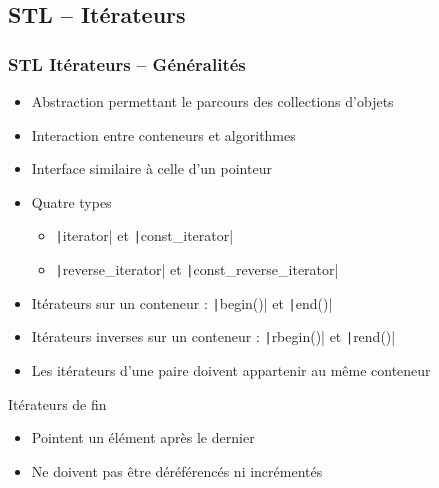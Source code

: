 \documentclass[C++.tex]{subfiles}
\begin{document}
\subsection*{STL -- Itérateurs}
\begin{frame}[fragile]
	\frametitle{STL Itérateurs -- Généralités}
	\begin{itemize}
		\item Abstraction permettant le parcours des collections d'objets
		\item Interaction entre conteneurs et algorithmes
		\item Interface similaire à celle d'un pointeur
		\item Quatre types
		\begin{itemize}
			\item \texttt|iterator| et \texttt|const_iterator|
			\item \texttt|reverse_iterator| et \texttt|const_reverse_iterator|
		\end{itemize}
		\item Itérateurs sur un conteneur : \texttt|begin()| et \texttt|end()|
		\item Itérateurs inverses sur un conteneur : \texttt|rbegin()| et \texttt|rend()|
		\item Les itérateurs d'une paire doivent appartenir au même conteneur
	\end{itemize}

	\begin{alertblock}{Itérateurs de fin}
		\begin{itemize}
			\item Pointent un élément après le dernier
			\item Ne doivent pas être déréférencés ni incrémentés
		\end{itemize}
	\end{alertblock}

\end{frame}
\end{document}
